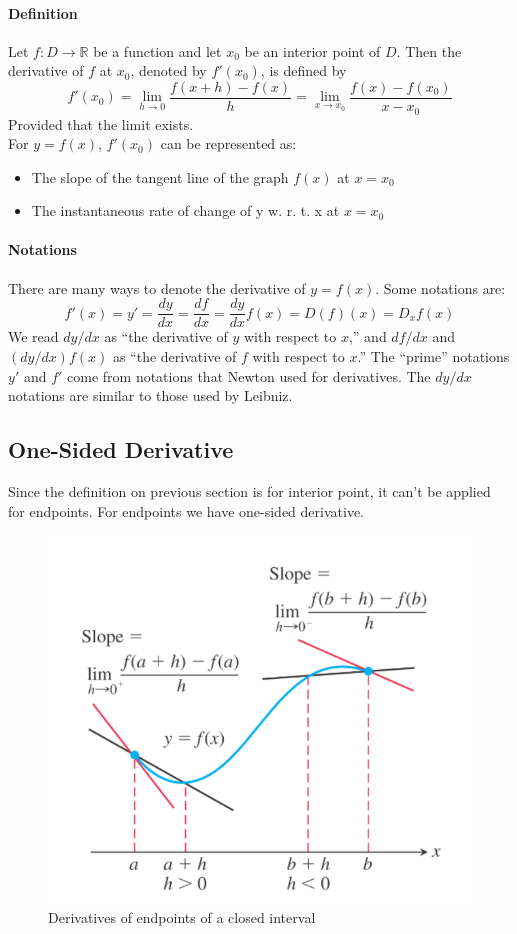 \documentclass[12pt]{article}
\begin{document}
\paragraph{Definition}Let $f : D \to \mathbb{R}$ be a function and let $x_0$ be an interior point of $D$. Then 
the derivative of $f$ at $x_0$, denoted by $f'(x_0)$, is defined by
\[
    f'(x_0) = \lim_{h \to 0} \frac{f(x + h) - f(x)}{h} = \lim_{x \to x_0} \frac{f(x) - f(x_0)}{x - x_0} 
\]
Provided that the limit exists. \\

\noindent
For $y = f(x)$, $f'(x_0)$ can be represented as:
\begin{itemize} 
     \item The slope of the tangent line of the graph $f(x)$ at $x = x_0$
     \item The instantaneous rate of change of y w. r. t. x at $x = x_0$
\end{itemize}

\paragraph{Notations} There are many ways to denote the derivative of $y = f(x)$. Some notations are:
\[
    f'(x) = y' = \frac{dy}{dx} = \frac{df}{dx} = \frac{dy}{dx} f(x) = D(f)(x) = D_x f(x) 
\]
We read $dy/dx$ as “the derivative of $y$ with respect to $x$,” and $df/dx$ and $(dy/dx) f(x)$ as “the derivative of $f$
with respect to $x$.” The “prime” notations $y'$ and $f'$ come from notations that Newton
used for derivatives. The $dy/dx$ notations are similar to those used by Leibniz. 
\subsection{One-Sided Derivative}
Since the definition on previous section is for interior point, it can't be applied for
endpoints. For endpoints we have one-sided derivative.

\begin{figure}[h!]
    \centering
    \includegraphics[width = 0.5\linewidth]{Images/derivative endpoints.png}
    \caption{Derivatives of endpoints of a closed interval}
\end{figure}
\end{document}
